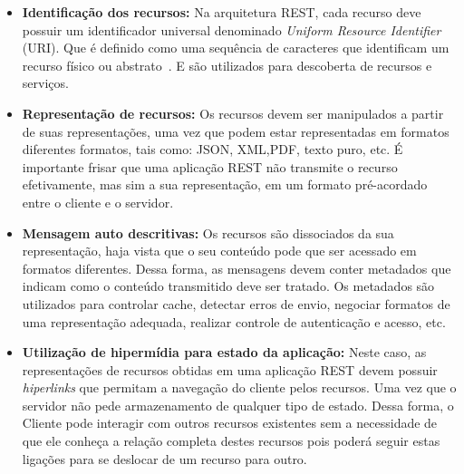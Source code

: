  \begin{itemize}
    \item \textbf{Identificação dos recursos:} Na arquitetura REST, cada recurso deve possuir um identificador universal denominado \emph{Uniform Resource Identifier} (URI). Que é definido como uma sequência de caracteres que identificam um recurso físico ou abstrato~\cite{bernerslee2005uri}. E são utilizados para descoberta de recursos e serviços.
    \item	\textbf{Representação de recursos:} Os recursos devem ser manipulados a partir de suas representações, uma vez que podem estar representadas em formatos diferentes formatos, tais como: JSON, XML,PDF, texto puro, etc. É importante frisar que uma aplicação REST não transmite o recurso efetivamente, mas sim a sua representação, em um formato pré-acordado entre o cliente e o servidor.
    \item	\textbf{Mensagem auto descritivas:} Os recursos são dissociados da sua representação, haja vista que o seu conteúdo  pode que ser acessado em formatos diferentes. Dessa forma, as mensagens devem conter metadados que indicam como o conteúdo transmitido deve ser tratado.  Os metadados são utilizados para controlar cache, detectar erros de envio, negociar formatos de uma representação adequada, realizar controle de autenticação e acesso, etc.
    \item	\textbf{Utilização de hipermídia para estado da aplicação:} Neste caso, as representações de recursos obtidas em uma aplicação REST devem possuir \emph{hiperlinks} que permitam a navegação do cliente pelos recursos. Uma vez que o servidor não pede  armazenamento de qualquer tipo de estado. Dessa forma, o Cliente pode interagir com outros recursos existentes sem a necessidade de que ele conheça a relação completa destes recursos pois poderá seguir estas ligações para se deslocar de um recurso para outro.


\end{itemize}

